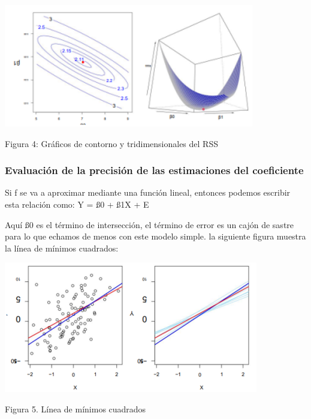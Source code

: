 \documentclass[
  letterpaper,
  DIV=11,
  numbers=noendperiod]{scrartcl}
\begin{document}
\begin{Figura 4: Gráficos de contorno y tridimensionales del RSS}

{\centering \includegraphics{cap13.png}

}

\caption{Figura 4: Gráficos de contorno y tridimensionales del RSS}

\end{Figura 4: Gráficos de contorno y tridimensionales del RSS}

\hypertarget{evaluaciuxf3n-de-la-precisiuxf3n-de-las-estimaciones-del-coeficiente}{%
\subsubsection{\texorpdfstring{\textbf{Evaluación de la precisión de las
estimaciones del
coeficiente}}{Evaluación de la precisión de las estimaciones del coeficiente}}\label{evaluaciuxf3n-de-la-precisiuxf3n-de-las-estimaciones-del-coeficiente}}

Si f se va a aproximar mediante una función lineal, entonces podemos
escribir esta relación como: Y = ß0 + ß1X + E

Aquí ß0 es el término de intersección, el término de error es un cajón
de sastre para lo que echamos de menos con este modelo simple. la
siguiente figura muestra la línea de mínimos cuadrados:

\begin{Figura 5. Línea de mínimos cuadrados}

{\centering \includegraphics{cap14.png}

}

\caption{Figura 5. Línea de mínimos cuadrados}

\end{Figura 5. Línea de mínimos cuadrados}
\end{document}
